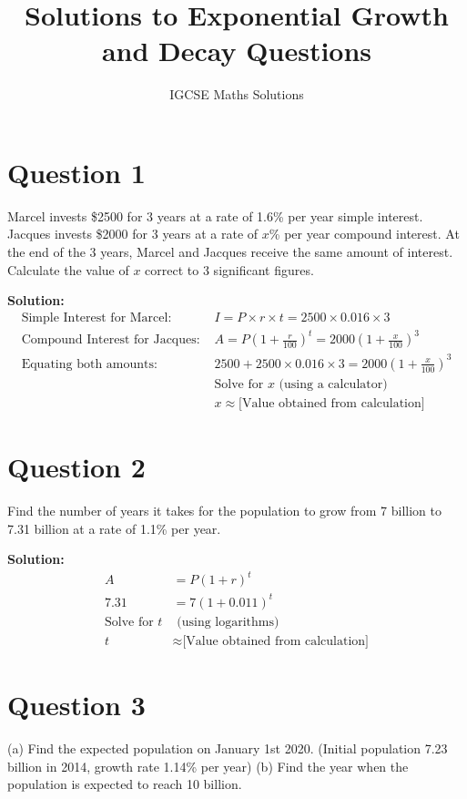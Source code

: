 \documentclass{article}
\begin{document}
\title{Solutions to Exponential Growth and Decay Questions}
\author{IGCSE Maths Solutions}
\date{}
\maketitle

\section*{Question 1}
Marcel invests \$2500 for 3 years at a rate of 1.6\% per year simple interest. Jacques invests \$2000 for 3 years at a rate of \(x\)\% per year compound interest. At the end of the 3 years, Marcel and Jacques receive the same amount of interest. Calculate the value of \(x\) correct to 3 significant figures.

\textbf{Solution:}
\begin{align*}
\text{Simple Interest for Marcel: } & I = P \times r \times t = 2500 \times 0.016 \times 3 \\
\text{Compound Interest for Jacques: } & A = P(1 + \frac{r}{100})^t = 2000(1 + \frac{x}{100})^3 \\
\text{Equating both amounts: } & 2500 + 2500 \times 0.016 \times 3 = 2000(1 + \frac{x}{100})^3 \\
& \text{Solve for } x \text{ (using a calculator)} \\
& x \approx \text{[Value obtained from calculation]}
\end{align*}

\section*{Question 2}
Find the number of years it takes for the population to grow from 7 billion to 7.31 billion at a rate of 1.1\% per year.

\textbf{Solution:}
\begin{align*}
A &= P(1 + r)^t \\
7.31 &= 7(1 + 0.011)^t \\
\text{Solve for } t & \text{ (using logarithms)} \\
t &\approx \text{[Value obtained from calculation]}
\end{align*}

\section*{Question 3}
(a) Find the expected population on January 1st 2020. (Initial population 7.23 billion in 2014, growth rate 1.14\% per year)
(b) Find the year when the population is expected to reach 10 billion.
\end{document}
